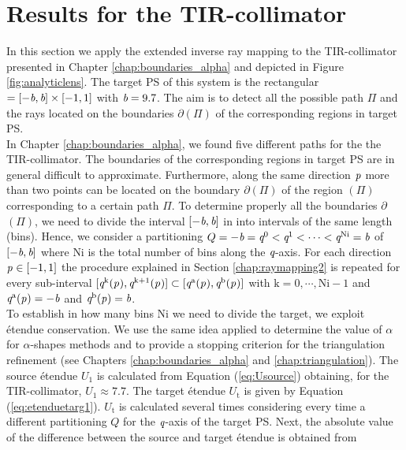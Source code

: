\section{Results for the TIR-collimator}\label{sec:TIR}
In this section we apply the extended inverse ray mapping to the TIR-collimator presented in Chapter \ref{chap:boundaries_alpha} and depicted in Figure \ref{fig:analyticlens}. The target PS of this system is the rectangular $= [-\textit{b}, \textit{b}]\times[-1,1]$ with $\textit{b}=9.7$. The aim is to detect all the possible path $\Pi$ and the rays located on the boundaries $\partial$$(\Pi)$ of the corresponding regions in target PS. 
\\ \indent In Chapter \ref{chap:boundaries_alpha}, we found five different paths for the the TIR-collimator. The boundaries of the corresponding regions in target PS  are in general difficult to approximate. Furthermore, along the same direction $\textit{p}_{\textrm{} \textit{}}$ more than two points can be located on the boundary $\partial$$(\Pi)$ of the region $(\Pi)$ corresponding to a certain path $\Pi$. To determine properly all the boundaries 
$\partial$$(\Pi)$, we need to divide the interval $[-\textit{b}, \textit{b}]$ in 
 into intervals of the same length (bins). Hence, we consider a partitioning 
$Q = -\textit{b}=\textit{q}^{0}<\textit{q}^{1}<\cdots<\textit{q}^{\textrm{Ni}}=\textit{b}$ of $[-\textit{b}, \textit{b}]$ where $\textrm{Ni}$ is the total number of bins along the $\textit{q}$-axis.
For each direction $\textit{p}_{\textrm{} \textit{}}\in [-1,1]$ the procedure explained in Section \ref{chap:raymapping2} is repeated for every sub-interval $[\textit{q}^{\textrm{k}}(\textit{p}_{\textrm{} \textit{}}), \textit{q}^{\textrm{k}+1}(\textit{p}_{\textrm{} \textit{}})]\subset [\textit{q}^{\textrm{a}}(\textit{p}_{\textrm{} \textit{}}), \textit{q}^{\textrm{b}}(\textit{p}_{\textrm{} \textit{}})]$ with $\textrm{k}=0, \cdots, \textrm{Ni}-1$ and $\textit{q}^{\textrm{a}}(\textit{p}_{\textrm{} \textit{}}) = -\textit{b}$ and $\textit{q}^{\textrm{b}}(\textit{p}_{\textrm{} \textit{}}) = \textit{b}$.\\ \indent
To establish in how many bins \textrm{Ni} we need to divide the target, we exploit \'{e}tendue conservation. We use the same idea applied to determine the value of $\alpha$ for $\alpha$-shapes methods and to provide a stopping criterion for the triangulation refinement (see Chapters \ref{chap:boundaries_alpha} and \ref{chap:triangulation}). 
The source \'{e}tendue $U_1$ is calculated from Equation (\ref{eq:Usource}) obtaining, for the TIR-collimator, $U_1 \approx 7.7$. The target \'{e}tendue $U_\textrm{t}$ is given by Equation (\ref{eq:etenduetarg1}). $U_\textrm{t}$ is calculated several times considering every time a different partitioning $Q$ for the $\textit{q}$-axis of the target PS. Next, the absolute value of the difference between the source and target \'{e}tendue is obtained from
